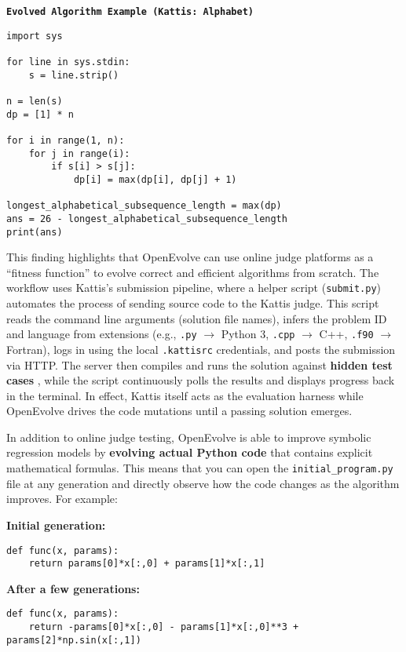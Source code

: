 \documentclass[11pt,letterpaper]{article}
\begin{document}
\textbf{\texttt{Evolved Algorithm Example (Kattis: Alphabet)}}  

\begin{verbatim}
import sys

for line in sys.stdin:
    s = line.strip()

n = len(s)
dp = [1] * n

for i in range(1, n):
    for j in range(i):
        if s[i] > s[j]:
            dp[i] = max(dp[i], dp[j] + 1)

longest_alphabetical_subsequence_length = max(dp)
ans = 26 - longest_alphabetical_subsequence_length
print(ans)
\end{verbatim}

\bigskip

This finding highlights that OpenEvolve can use online judge platforms as a ``fitness function'' to evolve correct and efficient algorithms from scratch. The workflow uses Kattis’s submission pipeline, where a helper script (\texttt{submit.py}) automates the process of sending source code to the Kattis judge. This script reads the command line arguments (solution file names), infers the problem ID and language from extensions (e.g., \texttt{.py} $\to$ Python 3, \texttt{.cpp} $\to$ C++, \texttt{.f90} $\to$ Fortran), logs in using the local \texttt{.kattisrc} credentials, and posts the submission via HTTP. The server then compiles and runs the solution against \textbf{hidden test cases}
, while the script continuously polls the results and displays progress back in the terminal. In effect, Kattis itself acts as the evaluation harness while OpenEvolve drives the code mutations until a passing solution emerges.

\bigskip

In addition to online judge testing, OpenEvolve is able to improve symbolic regression models by \textbf{evolving actual Python code} that contains explicit mathematical formulas. This means that you can open the \texttt{initial\_program.py} file at any generation and directly observe how the code changes as the algorithm improves. For example:

\textbf{Initial generation:}
\begin{verbatim}
def func(x, params):
    return params[0]*x[:,0] + params[1]*x[:,1]
\end{verbatim}

\textbf{After a few generations:}
\begin{verbatim}
def func(x, params):
    return -params[0]*x[:,0] - params[1]*x[:,0]**3 + params[2]*np.sin(x[:,1]) 
\end{verbatim}
\end{document}

